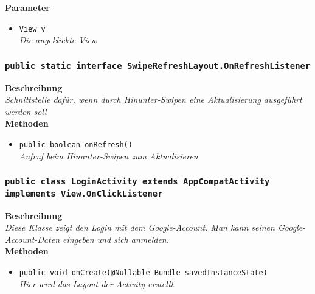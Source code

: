                 \textbf{Parameter}
                \begin{itemize}
                \item\texttt{View v}\\
                \textit{Die angeklickte View}\\
                \end{itemize} 
                
        \subsubsection{\texttt{public static interface SwipeRefreshLayout.OnRefreshListener}}
        
      	        \textbf{Beschreibung} \\
     	        \textit{Schnittstelle dafür, wenn durch Hinunter-Swipen eine Aktualisierung ausgeführt werden soll} \\
                
                \textbf{Methoden}
                \begin{itemize}
        		\item\texttt{{public boolean onRefresh()}}\\
                \textit{Aufruf beim Hinunter-Swipen zum Aktualisieren}\\
                \end{itemize}       
                
      	\subsubsection{\texttt{public class LoginActivity \textbf{extends} AppCompatActivity \textbf{implements} View.OnClickListener}}
        
      	        \textbf{Beschreibung} \\
     	        \textit{Diese Klasse zeigt den Login mit dem Google-Account. Man kann seinen Google-Account-Daten eingeben und sich anmelden.} \\
                
                \textbf{Methoden}
                \begin{itemize}
        		\item\texttt{{public void onCreate(@Nullable Bundle savedInstanceState)}}\\
                \textit{Hier wird das Layout der Activity erstellt.}\\
                \end{itemize}
                
